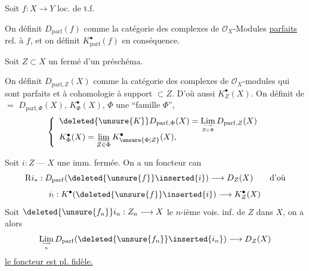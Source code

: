 Soit $f:X\longrightarrow Y$ loc. de t.f.

On définit $D_{\mathrm{parf}}(f)$ comme la catégorie  des complexes de $\mathcal O_X$-Modules \uline{parfaits} rel. à $f$, et on définit $K^\bullet_{\mathrm{parf}}(f)$ en conséquence.

Soit $Z\subset X$ un fermé d'un préschéma.

On définit $D_{\mathrm{parf},Z}(X)$ comme la catégorie des complexes de $\mathcal O_X$-modules qui sont parfaits et à cohomologie à support $\subset Z$. D'où aussi $K_Z^\bullet(X)$.
On définit de $=$ $D_{\mathrm{parf},\Phi}(X)$, $K_\Phi^\bullet(X)$, $\Phi$ une ``famille $\Phi$'', 
\[
\left\{\begin{array}{l}
\deleted{\unsure{K}}D_{\mathrm{parf},\Phi}(X)=\displaystyle\mathop{\mathrm{Lim}}\limits_{\longrightarrow\atop Z\in\Phi}D_{\mathrm{parf},Z}(X)\\
K_\Phi^\bullet(X)=\displaystyle\mathop{\underline{\lim}}\limits_{Z\in\Phi}K^\bullet_{\unsure{\Phi|Z}}(X),
\end{array}\right.
\]

Soit $i:Z\mathbin{\text{---}}X$ une imm. fermée. On a un foncteur can
\[
\mathrm Ri_*:D_{\mathrm{parf}}(\deleted{\unsure{f}}\inserted{i})\longrightarrow D_Z(X)\qquad\text{d'où}
\]
\[
i_!:K^\bullet(\deleted{\unsure{f}}\inserted{i})\longrightarrow K_Z^\bullet(X)
\]
Soit $\deleted{\unsure{f_n}}i_n:Z_n\longrightarrow X$ le $n$-ième vois. inf. de $Z$ dans $X$, on a alors
\[
\mathop{\mathrm{Lim}}\limits_{\longrightarrow\atop n}D_{\mathrm{parf}}(\deleted{\unsure{f_n}}\inserted{i_n})\longrightarrow D_Z(X)
\]
\uline{le foncteur est pl. fidèle.}
